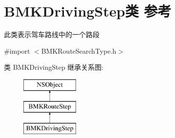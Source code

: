 \hypertarget{interface_b_m_k_driving_step}{}\section{B\+M\+K\+Driving\+Step类 参考}
\label{interface_b_m_k_driving_step}


此类表示驾车路线中的一个路段  




{\ttfamily \#import $<$B\+M\+K\+Route\+Search\+Type.\+h$>$}

类 B\+M\+K\+Driving\+Step 继承关系图\+:\begin{figure}[H]
\begin{center}
\leavevmode
\includegraphics[height=3.000000cm]{interface_b_m_k_driving_step}
\end{center}
\end{figure}
